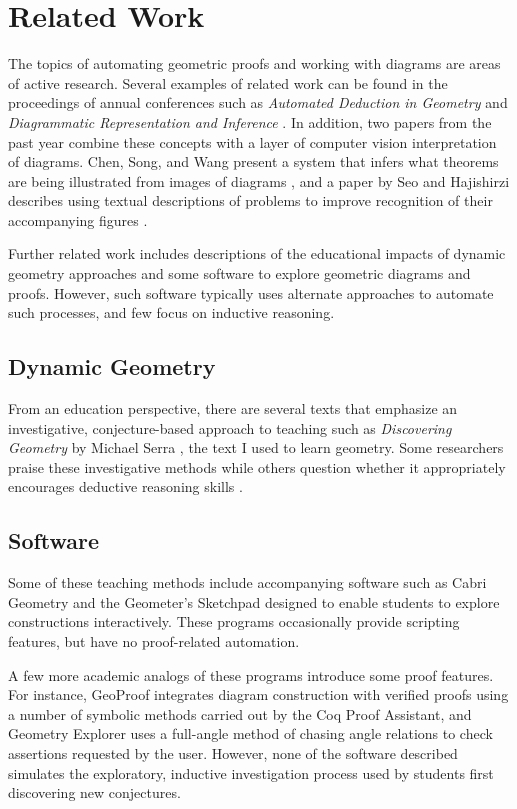 \chapter{Related Work}
\label{chap:related-work}

The topics of automating geometric proofs and working with diagrams
are areas of active research.  Several examples of related work can be
found in the proceedings of annual conferences such as \emph{Automated
  Deduction in Geometry} \cite{autoDeduction} and \emph {Diagrammatic
  Representation and Inference} \cite{diagramInference}.  In addition,
two papers from the past year combine these concepts with a layer of
computer vision interpretation of diagrams.  Chen, Song, and Wang
present a system that infers what theorems are being illustrated from
images of diagrams \cite{fromImages}, and a paper by Seo and
Hajishirzi describes using textual descriptions of problems to improve
recognition of their accompanying figures \cite{diagramUnderstanding}.

Further related work includes descriptions of the educational impacts
of dynamic geometry approaches and some software to explore geometric
diagrams and proofs.  However, such software typically uses alternate
approaches to automate such processes, and few focus on inductive
reasoning.

\section{Dynamic Geometry}
From an education perspective, there are several texts that emphasize
an investigative, conjecture-based approach to teaching such as
\emph{Discovering Geometry} by Michael Serra \cite{serraDiscovering},
the text I used to learn geometry.  Some researchers praise these
investigative methods \cite{geoTransformations} while others question
whether it appropriately encourages deductive reasoning skills
\cite{geoTeaching}.

\section{Software}
Some of these teaching methods include accompanying software such as
Cabri Geometry \cite{cabri} and the Geometer's Sketchpad
\cite{geoSketchpad} designed to enable students to explore
constructions interactively.  These programs occasionally provide
scripting features, but have no proof-related automation.

A few more academic analogs of these programs introduce some proof
features.  For instance, GeoProof \cite{geoProof} integrates diagram
construction with verified proofs using a number of symbolic methods
carried out by the Coq Proof Assistant, and Geometry Explorer
\cite{geoExplorer} uses a full-angle method of chasing angle relations
to check assertions requested by the user.  However, none of the
software described simulates the exploratory, inductive investigation
process used by students first discovering new conjectures.

